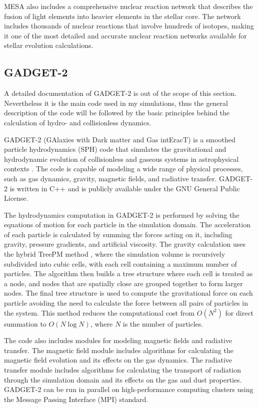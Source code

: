 MESA also includes a comprehensive nuclear reaction network that describes the fusion of light elements into heavier elements in the stellar core. The network includes thousands of nuclear reactions that involve hundreds of isotopes, making it one of the most detailed and accurate nuclear reaction networks available for stellar evolution calculations.


\subsection{GADGET-2}

A detailed documentation of GADGET-2 is out of the scope of this section. Nevertheless it is the main code used in my simulations, thus the general description of the code will be followed by the basic principles behind the calculation of hydro- and collisionless dynamics.

GADGET-2 (GAlaxies with Dark matter and Gas intEracT) is a smoothed particle hydrodynamics (SPH) code that simulates the gravitational and hydrodynamic evolution of collisionless and gaseous systems in astrophysical contexts \citep{springel2005cosmological}. The code is capable of modeling a wide range of physical processes, such as gas dynamics, gravity, magnetic fields, and radiative transfer. GADGET-2 is written in C++ and is publicly available under the GNU General Public License.

The hydrodynamics computation in GADGET-2 is performed by solving the equations of motion for each particle in the simulation domain. The acceleration of each particle is calculated by summing the forces acting on it, including gravity, pressure gradients, and artificial viscosity. The gravity calculation uses the hybrid TreePM method \citep{bode2000tree,bagla2002treepm}, where the simulation volume is recursively subdivided into cubic cells, with each cell containing a maximum number of particles. The algorithm then builds a tree structure where each cell is treated as a node, and nodes that are spatially close are grouped together to form larger nodes. The final tree structure is used to compute the gravitational force on each particle avoiding the need to calculate the force between all pairs of particles in the system. This method reduces the computational cost from $O(N^2)$ for direct summation to $O(N\log N)$, where $N$ is the number of particles.

The code also includes modules for modeling magnetic fields and radiative transfer. The magnetic field module includes algorithms for calculating the magnetic field evolution and its effects on the gas dynamics. The radiative transfer module includes algorithms for calculating the transport of radiation through the simulation domain and its effects on the gas and dust properties. GADGET-2 can be run in parallel on high-performance computing clusters using the Message Passing Interface (MPI) standard.


